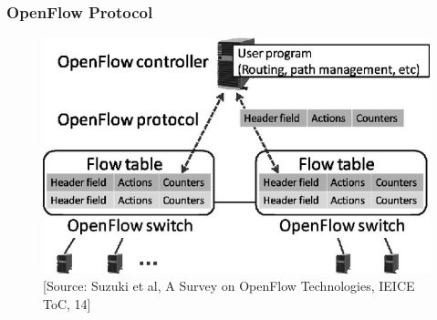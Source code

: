 \documentclass{beamer}
\begin{document}
\begin{frame}
  \frametitle{OpenFlow Protocol}
  \begin{figure}
    \begin{center}
      \includegraphics[scale=0.95]{images/sdn-15}
    \end{center}
    \vspace{1cm}
    \caption{\small{[Source: Suzuki et al, A Survey on OpenFlow Technologies, IEICE ToC, 14]}}
  \end{figure}
\end{frame}
\end{document}
